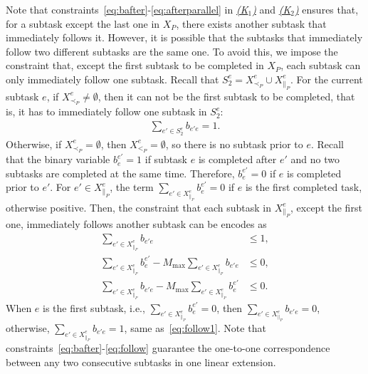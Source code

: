 \documentclass[Afour,sageh,times]{sagej}
\begin{document}
{{{{Note that constraints~\eqref{eq:bafter}-\eqref{eq:afterparallel} in \hyperref[activation:a]{\it (K$_1$)} and \hyperref[activation:b]{\it (K$_2$)} ensures that, for a subtask except the last one in $X_P$, there exists another subtask that immediately follows it. However, it is possible that the subtasks that immediately follow two different subtasks are the same one. To avoid this, we impose the constraint that, except the first subtask   to be completed in $X_P$, each subtask  can only immediately follow one subtask. Recall that $S_2^e = X^e_{\prec_{P}} \cup X^e_{\|_{P}}$.  For the current subtask $e$, if  $X^e_{\prec_{P}} \neq \emptyset$, then it can not be the first subtask to be completed, that is, it has to immediately follow one subtask in $S_2^e$:
\begingroup\makeatletter\def\f@size{10}\check@mathfonts
\def\maketag@@@#1{\hbox{\m@th\normalsize\normalfont#1}}%
  \begin{align}\label{eq:follow1}
 \sum_{e' \in S_2^e} b_{e'e} = 1.
\end{align}
  \endgroup
Otherwise, if $X^e_{\prec_{P}} = \emptyset$, then  $X^e_{<_{P}} = \emptyset$,  so there is no subtask prior to $e$. Recall that the binary variable $b_e^{e'}=1$ if subtask $e$ is completed after $e'$ and no two subtasks are completed at the same time. Therefore, $b_e^{e'}=0$ if $e$ is completed prior to $e'$. For $e' \in  X_{\|_P}^e$, the term $\sum_{e' \in X_{\|_P}^e } {b}_{e}^{e'}=0$ if $e$ is the first completed task, otherwise  positive. Then, the constraint that each subtask in $X_{\|_P}^e$, except the first one,  immediately follows another subtask can be encodes as
\begingroup\makeatletter\def\f@size{10}\check@mathfonts
\def\maketag@@@#1{\hbox{\m@th\normalsize\normalfont#1}}%
\begin{subequations}\label{eq:follow}
  \begin{align}
  \sum_{e' \in X_{\|_P}^e} b_{e'e} & \le 1,\label{eq:follow_a}\\
 \sum_{e' \in X^e_{\|_{P}}  } b_{e}^{e'} - M_{\text{max}}  \sum_{e' \in X_{\|_P}^e} b_{e'e} &  \leq 0, \label{eq:follow_b} \\
  \sum_{e' \in X_{\|_P}^e} b_{e'e} - M_{\text{max}} \sum_{e' \in X^e_{\|_{P}}  } b_{e}^{e'} & \leq0 . \label{eq:follow_c}
\end{align}
\end{subequations}
\endgroup
When $e$ is the first subtask, i.e., $\sum_{e' \in X^e_{\|_{P}}  } b_{e}^{e'}=0$, then $\sum_{e' \in X_{\|_P}^e} b_{e'e} = 0$, otherwise, $\sum_{e' \in X_{\|_P}^e} b_{e'e} = 1$, same as~\eqref{eq:follow1}. Note that constraints~\eqref{eq:bafter}-\eqref{eq:follow} guarantee the one-to-one correspondence between any two consecutive subtasks in one linear extension.


}}}}
\end{document}
